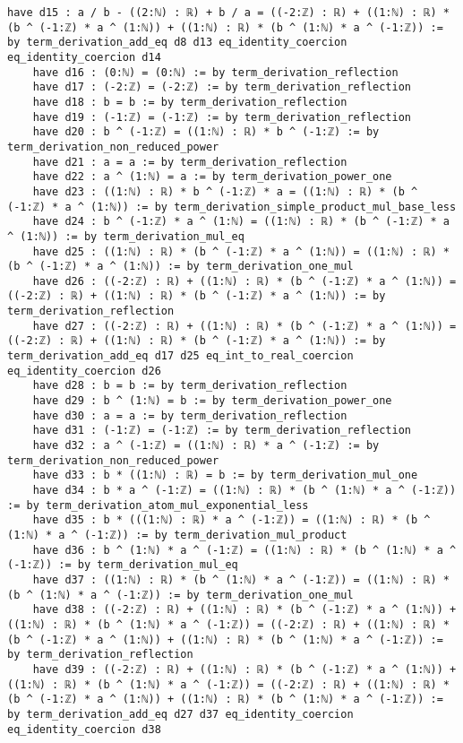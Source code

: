 \documentclass{article}
\begin{document}
\begin{tcolorbox}[colback=white!10, width=\linewidth]
\begin{lstlisting}[language=Lean4]
    have d15 : a / b - ((2:ℕ) : ℝ) + b / a = ((-2:ℤ) : ℝ) + ((1:ℕ) : ℝ) * (b ^ (-1:ℤ) * a ^ (1:ℕ)) + ((1:ℕ) : ℝ) * (b ^ (1:ℕ) * a ^ (-1:ℤ)) := by term_derivation_add_eq d8 d13 eq_identity_coercion eq_identity_coercion d14
    have d16 : (0:ℕ) = (0:ℕ) := by term_derivation_reflection
    have d17 : (-2:ℤ) = (-2:ℤ) := by term_derivation_reflection
    have d18 : b = b := by term_derivation_reflection
    have d19 : (-1:ℤ) = (-1:ℤ) := by term_derivation_reflection
    have d20 : b ^ (-1:ℤ) = ((1:ℕ) : ℝ) * b ^ (-1:ℤ) := by term_derivation_non_reduced_power
    have d21 : a = a := by term_derivation_reflection
    have d22 : a ^ (1:ℕ) = a := by term_derivation_power_one
    have d23 : ((1:ℕ) : ℝ) * b ^ (-1:ℤ) * a = ((1:ℕ) : ℝ) * (b ^ (-1:ℤ) * a ^ (1:ℕ)) := by term_derivation_simple_product_mul_base_less
    have d24 : b ^ (-1:ℤ) * a ^ (1:ℕ) = ((1:ℕ) : ℝ) * (b ^ (-1:ℤ) * a ^ (1:ℕ)) := by term_derivation_mul_eq
    have d25 : ((1:ℕ) : ℝ) * (b ^ (-1:ℤ) * a ^ (1:ℕ)) = ((1:ℕ) : ℝ) * (b ^ (-1:ℤ) * a ^ (1:ℕ)) := by term_derivation_one_mul
    have d26 : ((-2:ℤ) : ℝ) + ((1:ℕ) : ℝ) * (b ^ (-1:ℤ) * a ^ (1:ℕ)) = ((-2:ℤ) : ℝ) + ((1:ℕ) : ℝ) * (b ^ (-1:ℤ) * a ^ (1:ℕ)) := by term_derivation_reflection
    have d27 : ((-2:ℤ) : ℝ) + ((1:ℕ) : ℝ) * (b ^ (-1:ℤ) * a ^ (1:ℕ)) = ((-2:ℤ) : ℝ) + ((1:ℕ) : ℝ) * (b ^ (-1:ℤ) * a ^ (1:ℕ)) := by term_derivation_add_eq d17 d25 eq_int_to_real_coercion eq_identity_coercion d26
    have d28 : b = b := by term_derivation_reflection
    have d29 : b ^ (1:ℕ) = b := by term_derivation_power_one
    have d30 : a = a := by term_derivation_reflection
    have d31 : (-1:ℤ) = (-1:ℤ) := by term_derivation_reflection
    have d32 : a ^ (-1:ℤ) = ((1:ℕ) : ℝ) * a ^ (-1:ℤ) := by term_derivation_non_reduced_power
    have d33 : b * ((1:ℕ) : ℝ) = b := by term_derivation_mul_one
    have d34 : b * a ^ (-1:ℤ) = ((1:ℕ) : ℝ) * (b ^ (1:ℕ) * a ^ (-1:ℤ)) := by term_derivation_atom_mul_exponential_less
    have d35 : b * (((1:ℕ) : ℝ) * a ^ (-1:ℤ)) = ((1:ℕ) : ℝ) * (b ^ (1:ℕ) * a ^ (-1:ℤ)) := by term_derivation_mul_product
    have d36 : b ^ (1:ℕ) * a ^ (-1:ℤ) = ((1:ℕ) : ℝ) * (b ^ (1:ℕ) * a ^ (-1:ℤ)) := by term_derivation_mul_eq
    have d37 : ((1:ℕ) : ℝ) * (b ^ (1:ℕ) * a ^ (-1:ℤ)) = ((1:ℕ) : ℝ) * (b ^ (1:ℕ) * a ^ (-1:ℤ)) := by term_derivation_one_mul
    have d38 : ((-2:ℤ) : ℝ) + ((1:ℕ) : ℝ) * (b ^ (-1:ℤ) * a ^ (1:ℕ)) + ((1:ℕ) : ℝ) * (b ^ (1:ℕ) * a ^ (-1:ℤ)) = ((-2:ℤ) : ℝ) + ((1:ℕ) : ℝ) * (b ^ (-1:ℤ) * a ^ (1:ℕ)) + ((1:ℕ) : ℝ) * (b ^ (1:ℕ) * a ^ (-1:ℤ)) := by term_derivation_reflection
    have d39 : ((-2:ℤ) : ℝ) + ((1:ℕ) : ℝ) * (b ^ (-1:ℤ) * a ^ (1:ℕ)) + ((1:ℕ) : ℝ) * (b ^ (1:ℕ) * a ^ (-1:ℤ)) = ((-2:ℤ) : ℝ) + ((1:ℕ) : ℝ) * (b ^ (-1:ℤ) * a ^ (1:ℕ)) + ((1:ℕ) : ℝ) * (b ^ (1:ℕ) * a ^ (-1:ℤ)) := by term_derivation_add_eq d27 d37 eq_identity_coercion eq_identity_coercion d38

\end{lstlisting}
\end{tcolorbox}
\end{document}
